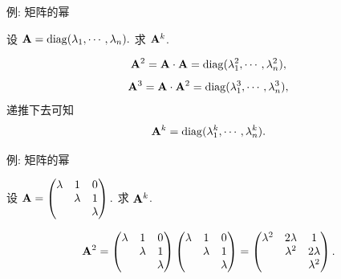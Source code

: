 \begin{frame}{例: 矩阵的幂}
	\onslide<+->
	\begin{example}
		设
		${\mathbf{A}}={\mathrm{diag}}(\lambda_1,\cdots,\lambda_n).$
		求 ${\mathbf{A}}^k$.
	\end{example}
	\onslide<+->
	\begin{solution}
		\[{\mathbf{A}}^2={\mathbf{A}}\cdot{\mathbf{A}}={\mathrm{diag}}(\lambda_1^2,\cdots,\lambda_n^2),\]
		\[{\mathbf{A}}^3={\mathbf{A}}\cdot{\mathbf{A}}^2={\mathrm{diag}}(\lambda_1^3,\cdots,\lambda_n^3),\]
		递推下去可知
		\[{\mathbf{A}}^k={\mathrm{diag}}(\lambda_1^k,\cdots,\lambda_n^k).\]
	\end{solution}
\end{frame}


\begin{frame}{例: 矩阵的幂}
	\onslide<+->
	\begin{example}
		设 ${\mathbf{A}}=\begin{pmatrix}
			\lambda&1&0\\
			&\lambda&1\\
			&&\lambda
		\end{pmatrix}.$
		求 ${\mathbf{A}}^k$.
	\end{example}
	\onslide<+->
	\begin{solution}
		\[{\mathbf{A}}^2=\begin{pmatrix}
			\lambda&1&0\\
			&\lambda&1\\
			&&\lambda
		\end{pmatrix}\begin{pmatrix}
			\lambda&1&0\\
			&\lambda&1\\
			&&\lambda
		\end{pmatrix}=\begin{pmatrix}
			\lambda^2&2\lambda&1\\
			&\lambda^2&2\lambda\\
			&&\lambda^2
		\end{pmatrix}.\]
	\end{solution}
	\end{frame}
	
